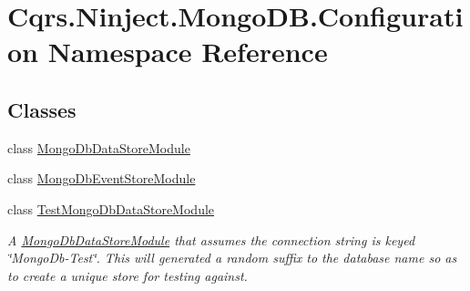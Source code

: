 \hypertarget{namespaceCqrs_1_1Ninject_1_1MongoDB_1_1Configuration}{}\section{Cqrs.\+Ninject.\+Mongo\+D\+B.\+Configuration Namespace Reference}
\label{namespaceCqrs_1_1Ninject_1_1MongoDB_1_1Configuration}
\subsection*{Classes}
\begin{DoxyCompactItemize}
\item 
class \hyperlink{classCqrs_1_1Ninject_1_1MongoDB_1_1Configuration_1_1MongoDbDataStoreModule}{Mongo\+Db\+Data\+Store\+Module}
\item 
class \hyperlink{classCqrs_1_1Ninject_1_1MongoDB_1_1Configuration_1_1MongoDbEventStoreModule}{Mongo\+Db\+Event\+Store\+Module}
\item 
class \hyperlink{classCqrs_1_1Ninject_1_1MongoDB_1_1Configuration_1_1TestMongoDbDataStoreModule}{Test\+Mongo\+Db\+Data\+Store\+Module}
\begin{DoxyCompactList}\small\item\em A \hyperlink{classCqrs_1_1Ninject_1_1MongoDB_1_1Configuration_1_1MongoDbDataStoreModule}{Mongo\+Db\+Data\+Store\+Module} that assumes the connection string is keyed \char`\"{}\+Mongo\+Db-\/\+Test\char`\"{}. This will generated a random suffix to the database name so as to create a unique store for testing against. \end{DoxyCompactList}\end{DoxyCompactItemize}
